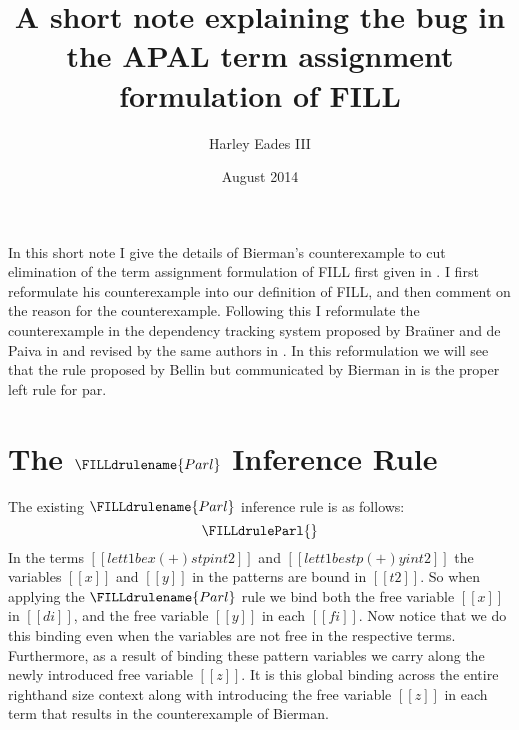 \documentclass{article}
\title{A short note explaining the bug in the APAL term assignment formulation of FILL}
\author{Harley Eades III}
\date{August 2014}
\begin{document}
\maketitle

In this short note I give the details of Bierman's counterexample
\cite{Bierman:1996} to cut elimination of the term assignment
formulation of FILL first given in \cite{Hyland:1993}.  I first
reformulate his counterexample into our definition of FILL, and then
comment on the reason for the counterexample.  Following this I
reformulate the counterexample in the dependency tracking system
proposed by Bra\"uner and de Paiva in \cite{Brauner:1996} and revised
by the same authors in \cite{Brauner:1998}.  In this reformulation we
will see that the rule proposed by Bellin but communicated by Bierman
in \cite{Bierman:1996} is the proper left rule for par.

\section{The $\FILLdrulename{Parl}$ Inference Rule}
\label{sec:the_parl_inference_rule}
The existing $\FILLdrulename{Parl}$ inference rule is as follows:
\[
  \FILLdruleParl{}
\]
In the terms $[[let t1 be x (+) stp in t2]]$ and $[[let t1 be stp (+) y
in t2]]$ the variables $[[x]]$ and $[[y]]$ in the patterns are bound
in $[[t2]]$. So when applying the $\FILLdrulename{Parl}$ rule we bind
both the free variable $[[x]]$ in $[[di]]$, and the free variable
$[[y]]$ in each $[[fi]]$.  Now notice that we do this binding even
when the variables are not free in the respective terms.  Furthermore,
as a result of binding these pattern variables we carry along the
newly introduced free variable $[[z]]$.  It is this global binding
across the entire righthand size context along with introducing the
free variable $[[z]]$ in each term that results in the counterexample
of Bierman.
\end{document}

